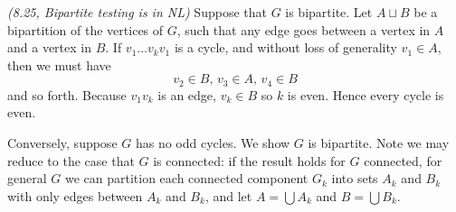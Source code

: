 \begin{problem}{\it(8.25, Bipartite testing is in NL)}
Suppose that $G$ is bipartite. Let $A\sqcup B$ be a bipartition of the vertices of $G$, such that any edge goes between a vertex in $A$ and a vertex in $B$. If $v_1\ldots v_kv_1$ is a cycle, and without loss of generality $v_1\in A$, then we must have
\[
v_2\in B,\,v_3\in A,\,v_4\in B
\]
and so forth. Because $v_1v_k$ is an edge, $v_k\in B$ so $k$ is even. Hence every cycle is even.

Conversely, suppose $G$ has no odd cycles. We show $G$ is bipartite. Note we may reduce to the case that $G$ is connected: if the result holds for $G$ connected, for general $G$ we can partition each connected component $G_k$ into sets $A_k$ and $B_k$ with only edges between $A_k$ and $B_k$, and let $A=\bigcup A_k$ and $B=\bigcup B_k$.


\end{problem}
